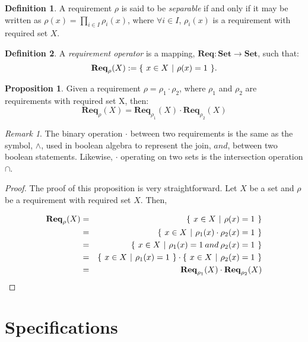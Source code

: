 \documentclass{article}
\theoremstyle{definition}
\newtheorem{definition}{Definition}[section]
\newtheorem{proposition}{Proposition}[section]
\theoremstyle{remark}
\newtheorem*{remark}{Remark}
\newcommand{\reqop}[2]{\mathbf{Req}_{#1}(#2)}
\newcommand{\setbuild}[3]
{
	\{\hspace{0.05in} 
	#1 \in #2 \hspace{0.05in} 
	| \hspace{0.05in}#3\hspace{0.05in}
	\}	
}
\begin{document}
		\begin{definition}
			A requirement $\rho$ is said to be \emph{separable} if and only if it may be written as $\rho(x) = \prod_{i \in I}{\rho_{i}(x)}$, where $\forall i \in I$, $\rho_{i}(x)$ is a requirement with required set $X$.
		\end{definition}
		
		\begin{definition}
			A \emph{requirement operator} is a mapping, $\mathbf{Req}: \mathbf{Set} \rightarrow \mathbf{Set}$, such that: \[\reqop{\rho}{X} := \setbuild{x}	{X}{\rho(x) = 1}.\]
		\end{definition}
		
		\begin{proposition}
			Given a requirement $\rho = \rho_{1}\cdot\rho_{2}$, where $\rho_{1}$ and $\rho_{2}$ are requirements with required set X, then: 
			\[
			\reqop{\rho}{X}\stackrel{~}{=}\reqop{\rho_{1}}{X}\cdot\reqop{\rho_{2}}{X}
			\]
		\end{proposition}
		
		\begin{remark}
			The binary operation $\cdot$ between two requirements is the same as the symbol, $\wedge$, used in boolean algebra to represent the join, $and$, between two boolean statements. Likewise, $\cdot$ operating on two sets is the intersection operation $\cap$. 
		\end{remark}
		
		\begin{proof}
			The proof of this proposition is very straightforward. Let $X$ be a set and $\rho$ be a requirement with required set $X$. Then,
			
			\begin{eqnarray}
			\reqop{\rho}{X} & = & \setbuild{x}{X}{\rho(x) = 1}\\ 
			& = & \setbuild{x}{X}{\rho_{1}(x)\cdot\rho_{2}(x) = 1}\\ 
			& = & \setbuild{x}{X}{\rho_{1}(x) = 1 \mathbin{and} \rho_{2}(x) = 1}\\ 
			& = & \setbuild{x}{X}{\rho_{1}(x) = 1}\cdot\setbuild{x}{X}{\rho_{2}(x) = 1}\\
			& = & \reqop{\rho_{1}}{X}\cdot\reqop{\rho_{2}}{X}
			\end{eqnarray}
		\end{proof}
	
	\section{Specifications}
	
\end{document}
